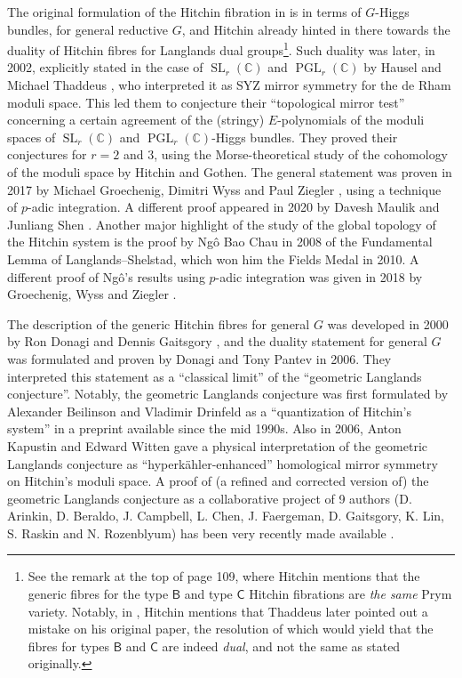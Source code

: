 \documentclass[12pt,a4paper]{amsbook}
\theoremstyle{remark} \newtheorem{rmk}[thm]{Remark}
\theoremstyle{definition} \newtheorem{defn}[thm]{Definition}
\theoremstyle{definition} \newtheorem{ex}[thm]{Example}
\theoremstyle{definition} \newtheorem{ej}{Exercise}
\newcommand{\C}{\mathbb C}
\DeclareMathOperator{\SL}{SL}
\DeclareMathOperator{\PGL}{PGL}
\begin{document}
The original formulation of the Hitchin fibration in \cite{Hitchin_Systems} is in terms of $G$-Higgs bundles, for general reductive $G$, and Hitchin already hinted in there towards the duality of Hitchin fibres for Langlands dual groups\footnote{See the remark at the top of page 109, where Hitchin mentions that the generic fibres for the type $\mathsf{B}$ and type $\mathsf{C}$ Hitchin fibrations are \textit{the same} Prym variety. Notably, in \cite{HitchinG2}, Hitchin mentions that Thaddeus later pointed out a mistake on his original paper, the resolution of which would yield that the fibres for types $\mathsf{B}$ and $\mathsf{C}$ are indeed \textit{dual}, and not the same as stated originally.}. Such duality was later, in 2002, explicitly stated in the case of $\SL_r(\C)$ and $\PGL_r(\C)$ by Hausel and Michael Thaddeus \cite{HauselThaddeus}, who interpreted it as SYZ mirror symmetry for the de Rham moduli space. This led them to conjecture their ``topological mirror test'' concerning a certain agreement of the (stringy) $E$-polynomials of the moduli spaces of $\SL_r(\C)$ and $\PGL_r(\C)$-Higgs bundles. They proved their conjectures for $r=2$ and $3$, using the Morse-theoretical study of the cohomology of the moduli space by Hitchin and Gothen. The general statement was proven in 2017 by Michael Groechenig, Dimitri Wyss and Paul Ziegler \cite{GWZ_Mirror}, using a technique of $p$-adic integration. A different proof appeared in 2020 by Davesh Maulik and Junliang Shen \cite{MaulikShen_Endoscopic}. Another major highlight of the study of the global topology of the Hitchin system is the proof by Ngô Bao Chau in 2008 \cite{Ngo} of the Fundamental Lemma of Langlands--Shelstad, which won him the Fields Medal in 2010. A different proof of Ngô's results using $p$-adic integration was given in 2018 by Groechenig, Wyss and Ziegler \cite{GWZ_Ngo}.

The description of the generic Hitchin fibres for general $G$ was developed in 2000 by Ron Donagi and Dennis Gaitsgory \cite{DonagiGaitsgory}, and the duality statement for general $G$ was formulated and proven by Donagi and Tony Pantev \cite{DonagiPantev} in 2006. They interpreted this statement as a ``classical limit'' of the ``geometric Langlands conjecture''. Notably, the geometric Langlands conjecture was first formulated by Alexander Beilinson and Vladimir Drinfeld as a ``quantization of Hitchin's system'' \cite{BeilinsonDrinfeld} in a preprint available since the mid 1990s. Also in 2006, Anton Kapustin and Edward Witten \cite{KapustinWitten} gave a physical interpretation of the geometric Langlands conjecture as ``hyperkähler-enhanced'' homological mirror symmetry on Hitchin's moduli space. A proof of (a refined and corrected version of) the geometric Langlands conjecture as a collaborative project of 9 authors (D. Arinkin, D. Beraldo, J. Campbell, L. Chen, J. Faergeman, D. Gaitsgory, K. Lin, S. Raskin and N. Rozenblyum) has been very recently made available \cite{ProofGLC}.
\end{document}
